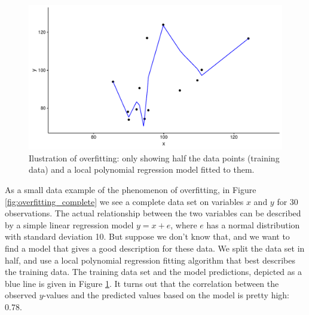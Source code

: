 \documentclass[]{book}\usepackage[]{graphicx}\usepackage[]{color}
\makeatletter
\def\maxwidth{ %
  \ifdim\Gin@nat@width>\linewidth
    \linewidth
  \else
    \Gin@nat@width
  \fi
}
\newenvironment{knitrout}{}{} %
\makeatother
\begin{document}
\begin{knitrout}
\color{fgcolor}\begin{figure}
\includegraphics[width=\maxwidth]{figure/overfitting_training-1} \caption[Ilustration of overfitting]{Ilustration of overfitting: only showing half the data points (training data) and a local polynomial regression model fitted to them.}\label{fig:overfitting_training}
\end{figure}


\end{knitrout}

As a small data example of the phenomenon of overfitting, in Figure \ref{fig:overfitting_complete} we see a complete data set on variables $x$ and $y$ for 30 observations. The actual relationship between the two variables can be described by a simple linear regression model $y = x + e$, where $e$ has a normal distribution with standard deviation 10. But suppose we don't know that, and we want to find a model that gives a good description for these data. We split the data set in half, and use a local polynomial regression fitting algorithm that best describes the training data. The training data set and the model predictions, depicted as a blue line is given in Figure \ref{fig:overfitting_training}. It turns out that the correlation between the observed $y$-values and the predicted values based on the model is pretty high: 0.78.
\end{document}
